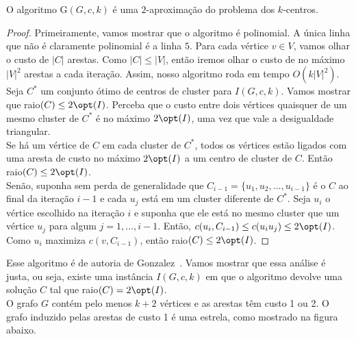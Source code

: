     \begin{theorem}
        O algoritmo {\sc G}$(G,c,k)$ é uma $2$-aproximação do problema dos $k$-centros.
    \end{theorem}
    \begin{proof}
        Primeiramente, vamos mostrar que o algoritmo é polinomial. A única linha que não é claramente polinomial é a linha $5$. Para cada vértice $v \in V$, vamos olhar o custo de $|C|$ arestas. Como $|C| \leq |V|$, então iremos olhar o custo de no máximo $|V|^2$ arestas a cada iteração. Assim, nosso algoritmo roda em tempo $O(k|V|^2)$. \\
        Seja $C^*$ um conjunto ótimo de centros de cluster para $I(G,c,k)$. Vamos mostrar que raio$(C) \leq 2\opt(I) $. Perceba que o custo entre dois vértices quaisquer de um mesmo cluster de $C^*$ é no máximo $2\opt(I)$, uma vez que vale a desigualdade triangular.\\ 
        Se há um vértice de $C$ em cada cluster de $C^*$, todos os vértices estão ligados com uma aresta de custo no máximo $2\opt(I)$ a um centro de cluster de $C$. Então raio$(C) \leq 2\opt(I)$. \\
        Senão, suponha sem perda de generalidade que $C_{i-1} = \{ u_1,u_2,\ldots,u_{i-1}\}$ é o $C$ ao final da iteração $i-1$ e cada $u_j$ está em um cluster diferente de $C^*$. Seja $u_i$ o vértice escolhido na iteração $i$ e suponha que ele está no mesmo cluster que um vértice $u_j$ para algum $j=1,\ldots,i-1$. Então, $c(u_i,C_{i-1}) \leq c(u_iu_j) \leq 2\opt(I)$. Como $u_i$ maximiza $c(v,C_{i-1})$, então raio$(C) \leq 2\opt(I)$.
    \end{proof}
    Esse algoritmo é de autoria de Gonzalez~\cite{GONZALEZ1985293}.
    Vamos mostrar que essa análise é justa, ou seja, existe uma instância $I(G,c,k)$ em que o algoritmo devolve uma solução $C$ tal que raio$(C) = 2 \opt(I)$. \\
    O grafo $G$ contém pelo menos $k+2$ vértices e as arestas têm custo 1 ou 2. O grafo induzido pelas arestas de custo 1 é uma estrela, como mostrado na figura abaixo.
